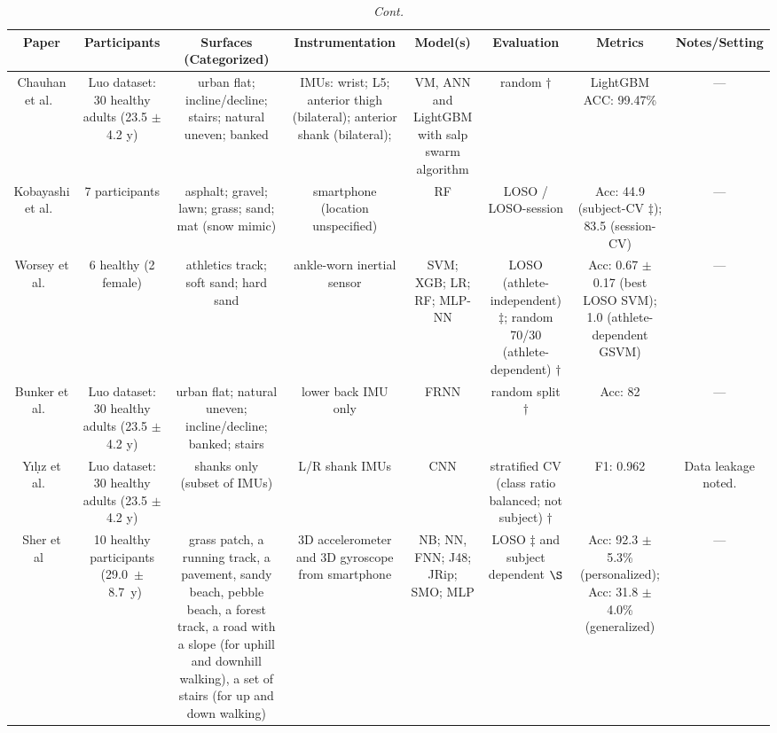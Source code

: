 \documentclass[sensors,article,accept,pdftex,moreauthors]{Definitions/mdpi}
\begin{document}
\begin{table}[H]
\begin{tabularx}{\textwidth}{CCCCCCCC}
\bottomrule
\end{tabularx}
\end{table}

\begin{table}[H]\ContinuedFloat
\caption{{\em Cont.}}
\begin{tabularx}{\textwidth}{CCCCCCCC}
\toprule
Paper	& Participants	& Surfaces (Categorized) & Instrumentation & Model(s) & Evaluation & Metrics & Notes/Setting\\
\midrule

Chauhan et al.~\cite{chauhan2025classifying}& Luo dataset: 30 healthy adults (23.5 $\pm$ 4.2 y) & urban flat; incline/decline; stairs; natural uneven; banked & IMUs: wrist; L5; anterior thigh (bilateral); anterior shank (bilateral); & VM, ANN and LightGBM with salp swarm algorithm & random \(\dagger\) & LightGBM ACC: 99.47\% & --- \\
\midrule
Kobayashi et al.~\cite{kobayashi2019estimation} & 7 participants & asphalt; gravel; lawn; grass; sand; mat (snow mimic) & smartphone (location unspecified) & RF & LOSO / LOSO-session & Acc: 44.9 (subject-CV \(\ddagger\)); 83.5 (session-CV) & --- \\
\midrule
Worsey et al.~\cite{worsey2021automatic} & 6 healthy (2 female) & athletics track; soft sand; hard sand & ankle-worn inertial sensor & SVM; XGB; LR; RF; MLP-NN & LOSO (athlete-independent) \(\ddagger\); random 70/30 (athlete-dependent) \(\dagger\) & Acc: 0.67 $\pm$ 0.17 (best LOSO SVM); 1.0 (athlete-dependent GSVM) & --- \\
\midrule
Bunker et al.~\cite{bunker2021towards} & Luo dataset: 30 healthy adults (23.5 $\pm$ 4.2 y) & urban flat; natural uneven; incline/decline; banked; stairs & lower back IMU only & FRNN & random split \(\dagger\) & Acc: 82 & --- \\
\midrule
Y\i l\d\i z et al.~\cite{yildiz2023towards} & Luo dataset: 30 healthy adults (23.5 $\pm$ 4.2 y) & shanks only (subset of IMUs) & L/R shank IMUs & CNN & stratified CV (class ratio balanced; not subject) \(\dagger\) & F1: 0.962 & Data leakage noted. \\
\midrule
Sher et al~\cite{sher2023towards} & 10 healthy participants (\mbox{29.0 $\pm$ 8.7 y}) & grass patch, a running track, a pavement, sandy beach, pebble beach, a forest track, a road with a slope (for uphill and downhill walking), a set of stairs (for up and down walking) & 3D accelerometer and 3D gyroscope from smartphone & NB; NN, FNN; J48; JRip; SMO; MLP & LOSO \(\ddagger\) and subject dependent \(\S\) & Acc: 92.3 $\pm$ 5.3\% (personalized); Acc: 31.8 $\pm$ 4.0\% (generalized) & --- \\

\bottomrule
\end{tabularx}
\end{table}
\end{document}
